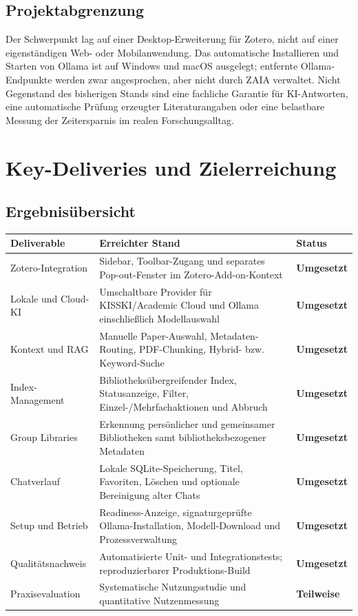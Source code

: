 \documentclass[11pt,a4paper,oneside,parskip=half]{scrartcl}
\newcommand{\done}{\textbf{\textcolor{ZAIAdarkgreen}{Umgesetzt}}}
\newcommand{\partlydone}{\textbf{\textcolor{ZAIAamber}{Teilweise}}}
\begin{document}
\subsection{Projektabgrenzung}

Der Schwerpunkt lag auf einer Desktop-Erweiterung für Zotero, nicht auf einer
eigenständigen Web- oder Mobilanwendung. Das automatische Installieren und
Starten von Ollama ist auf Windows und macOS ausgelegt; entfernte
Ollama-Endpunkte werden zwar angesprochen, aber nicht durch ZAIA verwaltet. Nicht
Gegenstand des bisherigen Stands sind eine fachliche Garantie für KI-Antworten,
eine automatische Prüfung erzeugter Literaturangaben oder eine belastbare
Messung der Zeitersparnis im realen Forschungsalltag.

\section{Key-Deliveries und Zielerreichung}

\subsection{Ergebnisübersicht}

\noindent\begin{tabularx}{\linewidth}{@{}L{3.5cm}Y L{2.35cm}@{}}
\toprule
\textbf{Deliverable} & \textbf{Erreichter Stand} & \textbf{Status} \\
\midrule
Zotero-Integration & Sidebar, Toolbar-Zugang und separates Pop-out-Fenster im
  Zotero-Add-on-Kontext & \done \\
Lokale und Cloud-KI & Umschaltbare Provider für KISSKI/Academic Cloud und
  Ollama einschließlich Modellauswahl & \done \\
Kontext und RAG & Manuelle Paper-Auswahl, Metadaten-Routing, PDF-Chunking,
  Hybrid- bzw. Keyword-Suche & \done \\
Index-Management & Bibliotheksübergreifender Index, Statusanzeige, Filter,
  Einzel-/Mehrfachaktionen und Abbruch & \done \\
Group Libraries & Erkennung persönlicher und gemeinsamer Bibliotheken samt
  bibliotheksbezogener Metadaten & \done \\
Chatverlauf & Lokale SQLite-Speicherung, Titel, Favoriten, Löschen und optionale
  Bereinigung alter Chats & \done \\
Setup und Betrieb & Readiness-Anzeige, signaturgeprüfte Ollama-Installation,
  Modell-Download und Prozessverwaltung & \done \\
Qualitätsnachweis & Automatisierte Unit- und Integrationstests; reproduzierbarer
  Produktions-Build & \done \\
Praxisevaluation & Systematische Nutzungsstudie und quantitative
  Nutzenmessung & \partlydone \\
\bottomrule
\end{tabularx}
\end{document}
